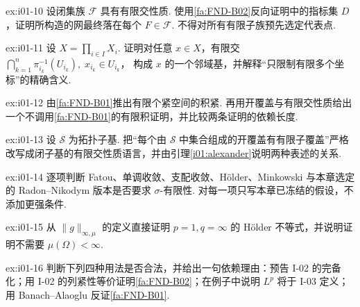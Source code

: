 \begin{FAExercise}[从有限交性质构造网]{ex:i01-10}
设闭集族 \(\displaystyle \mathcal F\) 具有有限交性质. 使用\autoref{fa:FND-B02}反向证明中的指标集 \(\displaystyle D\)，证明所构造的网最终落在每个 \(\displaystyle F\in\mathcal F\). 不得对所有有限子族预先选定代表点.
\end{FAExercise}

\begin{FAExercise}[积拓扑基本邻域]{ex:i01-11}
设 \(\displaystyle X=\prod_{i\in I}X_i\). 证明对任意 \(\displaystyle x\in X\)，有限交 \(\displaystyle \bigcap_{k=1}^{n}\pi_{i_k}^{-1}(U_{i_k}), \; x_{i_k}\in U_{i_k}\)，
构成 \(\displaystyle x\) 的一个邻域基，并解释“只限制有限多个坐标”的精确含义.
\end{FAExercise}

\begin{FAExercise}{ex:i01-12}
由\autoref{fa:FND-B01}推出有限个紧空间的积紧. 再用开覆盖与有限交性质给出一个不调用\autoref{fa:FND-B01}的有限积证明，并比较两条证明的依赖长度.
\end{FAExercise}

\begin{FAExercise}{ex:i01-13}
设 \(\displaystyle \mathcal S\) 为拓扑子基. 把“每个由 \(\displaystyle \mathcal S\) 中集合组成的开覆盖有有限子覆盖”严格改写成闭子基的有限交性质语言，并由引理\ref{i01:alexander}说明两种表述的关系.
\end{FAExercise}

\begin{FAExercise}[积分接口的假设辨析]{ex:i01-14}
逐项判断 Fatou、单调收敛、支配收敛、Hölder、Minkowski 与本章选定的 Radon--Nikodym 版本是否要求 \(\displaystyle \sigma\)-有限性. 对每一项只写本章已冻结的假设，不添加更强条件.
\end{FAExercise}

\begin{FAExercise}[Hölder 端点]{ex:i01-15}
从 \(\displaystyle \|g\|_{\infty,\mu}\) 的定义直接证明 \(\displaystyle p=1,q=\infty\) 的 Hölder 不等式，并说明证明不需要 \(\displaystyle \mu(\Omega)<\infty\).
\end{FAExercise}

\begin{FAExercise}[延后结果识别]{ex:i01-16}
判断下列四种用法是否合法，并给出一句依赖理由：预告 I-02 的完备化；用 I-02 的列紧性等价证明\autoref{fa:FND-B02}；在例子中说明 \(\displaystyle L^p\) 将于 I-03 定义；用 Banach--Alaoglu 反证\autoref{fa:FND-B01}.
\end{FAExercise}
